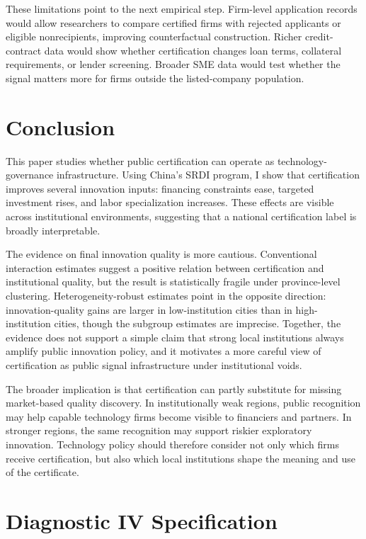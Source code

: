 \documentclass[12pt]{article}
\begin{document}
These limitations point to the next empirical step. Firm-level application records would allow researchers to compare certified firms with rejected applicants or eligible nonrecipients, improving counterfactual construction. Richer credit-contract data would show whether certification changes loan terms, collateral requirements, or lender screening. Broader SME data would test whether the signal matters more for firms outside the listed-company population.

\section{Conclusion}

This paper studies whether public certification can operate as technology-governance infrastructure. Using China's SRDI program, I show that certification improves several innovation inputs: financing constraints ease, targeted investment rises, and labor specialization increases. These effects are visible across institutional environments, suggesting that a national certification label is broadly interpretable.

The evidence on final innovation quality is more cautious. Conventional interaction estimates suggest a positive relation between certification and institutional quality, but the result is statistically fragile under province-level clustering. Heterogeneity-robust estimates point in the opposite direction: innovation-quality gains are larger in low-institution cities than in high-institution cities, though the subgroup estimates are imprecise. Together, the evidence does not support a simple claim that strong local institutions always amplify public innovation policy, and it motivates a more careful view of certification as public signal infrastructure under institutional voids.

The broader implication is that certification can partly substitute for missing market-based quality discovery. In institutionally weak regions, public recognition may help capable technology firms become visible to financiers and partners. In stronger regions, the same recognition may support riskier exploratory innovation. Technology policy should therefore consider not only which firms receive certification, but also which local institutions shape the meaning and use of the certificate.

\appendix
\section{Diagnostic IV Specification}
\end{document}
